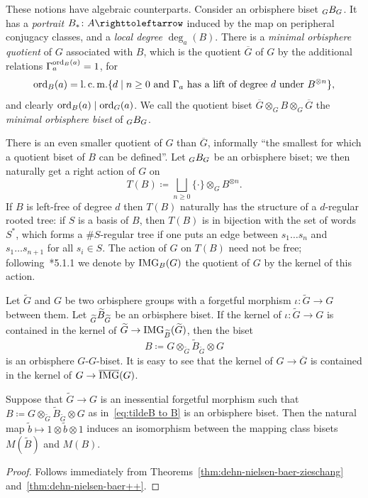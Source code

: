 \documentclass{amsart}
\begin{document}
These notions have algebraic counterparts. Consider an orbisphere
biset $\subscript G B_G$. It has a \emph{portrait}
$B_*\colon A\selfmap$ induced by the map on peripheral conjugacy
classes, and a \emph{local degree} $\deg_a(B)$. There is a
\emph{minimal orbisphere quotient} of $G$ associated with $B$, which
is the quotient $\overline G$ of $G$ by the additional relations
$\Gamma_a^{\operatorname{ord}_B(a)}=1$, for
\begin{equation}\label{eq:ordB}
  \operatorname{ord}_B(a)=\operatorname{l.c.m.}\{d\mid n\ge0\text{ and $\Gamma_a$ has a lift of degree $d$ under }B^{\otimes n}\},
\end{equation}
and clearly $\operatorname{ord}_{B}(a) \mid \operatorname{ord}_{G}(a)$. We call the quotient biset
$\overline G\otimes_G B\otimes_G\overline G$ the \emph{minimal
  orbisphere biset} of $\subscript G B_G$.

There is an even smaller quotient of $G$ than $\overline G$,
informally ``the smallest for which a quotient biset of $B$ can be
defined''. Let $\subscript G B_G$ be an orbisphere biset; we then
naturally get a right action of $G$ on
\[T(B)\coloneqq\bigsqcup_{n\ge0}\{\cdot\}\otimes_G B^{\otimes n}.
\]
If $B$ is left-free of degree $d$ then $T(B)$ naturally has the
structure of a $d$-regular rooted tree: if $S$ is a basis of $B$, then
$T(B)$ is in bijection with the set of words $S^*$, which forms a
$\#S$-regular tree if one puts an edge between $s_1\dots s_n$ and
$s_1\dots s_{n+1}$ for all $s_i\in S$. The action of $G$ on $T(B)$
need not be free; following~\cite{nekrashevych:ssg}*{5.1.1} we denote
by $\operatorname{IMG}_B(G)$ the quotient of $G$ by the kernel of this action.

Let $\widetilde G$ and $G$ be two orbisphere groups with a forgetful
morphism $\iota\colon\widetilde G\to G$ between them. Let
$\subscript{\widetilde G}{\widetilde B}_{\widetilde G}$ be an
orbisphere biset.  If the kernel of $\iota\colon\widetilde G\to G$ is
contained in the kernel of
$\widetilde G\to\operatorname{IMG}_{\widetilde B}(\widetilde G)$, then the biset
\begin{equation}\label{eq:tildeB to B}
  B\coloneqq G\otimes_{\widetilde G}\widetilde B_{\widetilde G}\otimes G
\end{equation}
is an orbisphere $G$-$G$-biset. It is easy to see that the kernel of
$G\to \overline G$ is contained in the kernel of
$G\to \overline {\operatorname{IMG}}(G)$.

\begin{cor}
  Suppose that $\widetilde G\to G$ is an inessential forgetful
  morphism such that
  $B\coloneqq G\otimes_{\widetilde G}\widetilde B_{\widetilde
    G}\otimes G$ as in~\eqref{eq:tildeB to B} is an orbisphere biset.
  Then the natural map
  $\widetilde b\mapsto 1\otimes\widetilde b\otimes 1$ induces an
  isomorphism between the mapping class bisets $M(\widetilde B)$ and
  $M(B)$.
\end{cor}
\begin{proof}
  Follows immediately from
  Theorems~\ref{thm:dehn-nielsen-baer-zieschang}
  and~\ref{thm:dehn-nielsen-baer++}.
\end{proof}
\end{document}
